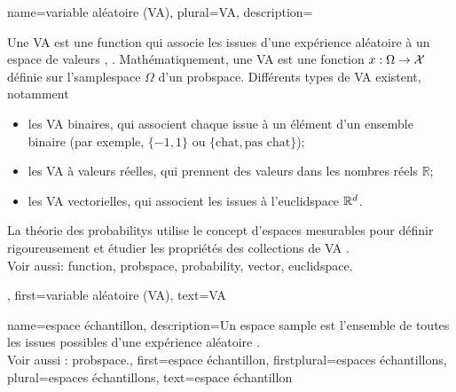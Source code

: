 {name={variable aléatoire (VA)}, plural={VA},
	description={Une VA est une \gls{function} qui associe les issues d’une expérience aléatoire à un espace de valeurs \cite{BillingsleyProbMeasure}, \cite{GrayProbBook}. 
		Mathématiquement, une VA est une fonction $x: \Omega \rightarrow \mathcal{X}$ définie sur l'\gls{samplespace} $\Omega$ d’un \gls{probspace}. 
		Différents types de VA existent, notamment  
		\begin{itemize} 
			\item {les VA binaires}, qui associent chaque issue à un élément d’un ensemble binaire (par exemple, $\{-1,1\}$ ou $\{\text{chat}, \text{pas chat}\}$); 
			\item {les VA à valeurs réelles}, qui prennent des valeurs dans les nombres réels $\mathbb{R}$;  
			\item {les VA vectorielles}, qui associent les issues à l’\gls{euclidspace} $\mathbb{R}^{d}$.  
		\end{itemize} 
		La théorie des \glspl{probability} utilise le concept d’espaces mesurables pour définir rigoureusement 
		et étudier les propriétés des collections de VA \cite{BillingsleyProbMeasure}.
		\\
		Voir aussi: \gls{function}, \gls{probspace}, \gls{probability}, \gls{vector}, \gls{euclidspace}.}, 
	first={variable aléatoire (VA)},
	text={VA}  
}

{name={espace échantillon}, 
	description={Un espace \gls{sample} est l’ensemble de toutes les issues possibles d’une expérience aléatoire \cite{papoulis,BillingsleyProbMeasure,AshProbMeasure,BertsekasProb}. 
	\\	
	Voir aussi : \gls{probspace}.},  
	first={espace échantillon}, 
	firstplural={espaces échantillons},
	plural={espaces échantillons},
	text={espace échantillon}
}


